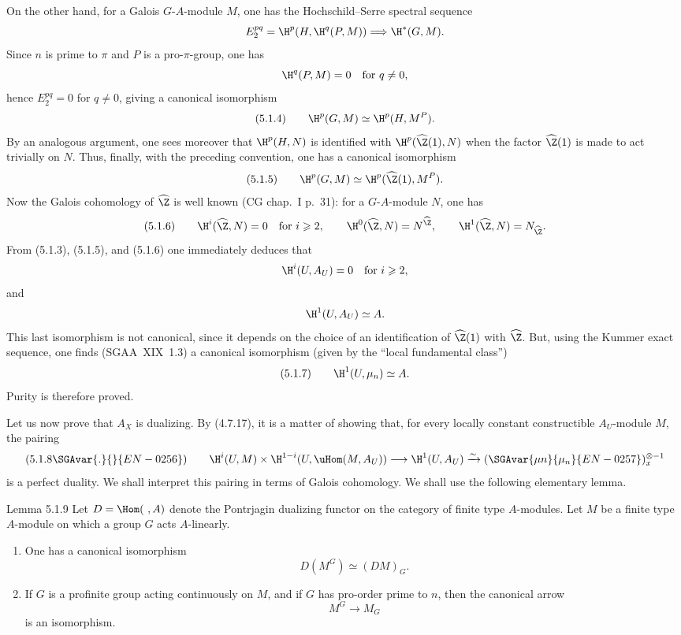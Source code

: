 \begin{prooftext}[Proof]
On the other hand, for a Galois $G$-$A$-module $M$, one has the Hochschild--Serre spectral sequence
\[
E_2^{pq}=\H^p(H,\H^q(P,M))\Longrightarrow \H^{*}(G,M).
\]
Since $n$ is prime to $\pi$ and $P$ is a pro-$\pi$-group, one has
\[
\H^q(P,M)=0\quad\text{for }q\ne0,
\]
hence $E_2^{pq}=0$ for $q\ne0$, giving a canonical isomorphism
\[
(5.1.4)\qquad \H^p(G,M)\simeq \H^p(H,M^P).
\]
By an analogous argument, one sees moreover that $\H^p(H,N)$ is identified with $\H^p(\widehat{\Z}(1),N)$ when the factor $\widehat{\Z}(1)$ is made to act trivially on $N$. Thus, finally, with the preceding convention, one has a canonical isomorphism
\[
(5.1.5)\qquad \H^p(G,M)\simeq \H^p(\widehat{\Z}(1),M^P).
\]
Now the Galois cohomology of $\widehat{\Z}$ is well known (CG chap.~I p.~31): for a $G$-$A$-module $N$, one has
\[
(5.1.6)\qquad
\H^i(\widehat{\Z},N)=0\quad\text{for }i\geqslant2,
\qquad
\H^0(\widehat{\Z},N)=N^{\widehat{\Z}},
\qquad
\H^1(\widehat{\Z},N)=N_{\widehat{\Z}}.
\]
From (5.1.3), (5.1.5), and (5.1.6) one immediately deduces that
\[
\H^i(U,A_U)=0\quad\text{for }i\geqslant2,
\]
and
\[
\H^1(U,A_U)\simeq A.
\]
This last isomorphism is not canonical, since it depends on the choice of an identification of $\widehat{\Z}(1)$ with $\widehat{\Z}$. But, using the Kummer exact sequence, one finds (SGAA~XIX~1.3) a canonical isomorphism (given by the ``local fundamental class'')
\[
(5.1.7)\qquad \H^1(U,\mu_n)\simeq A.
\]
Purity is therefore proved.

Let us now prove that $A_X$ is dualizing. By (4.7.17), it is a matter of showing that, for every locally constant constructible $A_U$-module $M$, the pairing
\[
(5.1.8\SGAvar{.}{}{EN-0256})\qquad \H^i(U,M)\times\H^{1-i}(U,\uHom(M,A_U))\longrightarrow \H^1(U,A_U)\xrightarrow{\sim}(\SGAvar{\mu n}{\mu_n}{EN-0257})_x^{\otimes -1}
\]
is a perfect duality. We shall interpret this pairing in terms of Galois cohomology. We shall use the following elementary lemma.
\end{prooftext}

\begin{statement}{Lemma 5.1.9}
Let $D=\Hom(\ ,A)$ denote the Pontrjagin dualizing functor on the category of finite type $A$-modules. Let $M$ be a finite type $A$-module on which a group $G$ acts $A$-linearly.
\begin{enumerate}[label=(\roman*)]
\item One has a canonical isomorphism
\[
D(M^G)\simeq (DM)_G.
\]
\item If $G$ is a profinite group acting continuously on $M$, and if $G$ has pro-order prime to $n$, then the canonical arrow
\[
M^G\longrightarrow M_G
\]
is an isomorphism.
\end{enumerate}
\end{statement}

